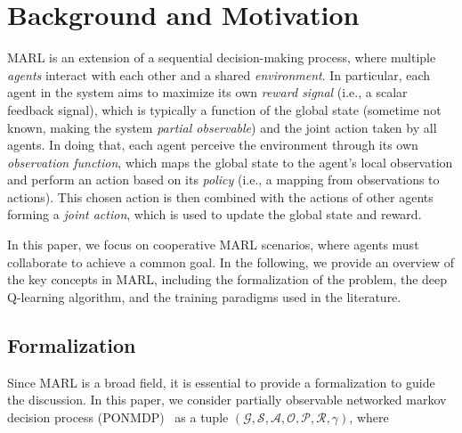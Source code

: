 \documentclass[sigconf]{acmart}
\begin{document}
\section{Background and Motivation}\label{sec:background}
MARL is an extension of a sequential decision-making process, 
where multiple \emph{agents} interact with each other and a shared \emph{environment}.
In particular, each agent in the system aims to maximize its own \emph{reward signal} (i.e., a scalar feedback signal),
which is typically a function of the global state (sometime not known, making the system \emph{partial observable}) and the joint action taken by all agents.
%
In doing that, each agent perceive the environment through its own \emph{observation function},
which maps the global state to the agent's local observation and perform an action based on its \emph{policy} (i.e., a mapping from observations to actions).
%
This chosen action is then combined with the actions of other agents forming a \emph{joint action},
which is used to update the global state and reward.
 
In this paper, we focus on cooperative MARL scenarios, 
where agents must collaborate to achieve a common goal.
In the following, we provide an overview of the key concepts in MARL, 
including the formalization of the problem, the deep Q-learning algorithm, and the training paradigms used in the literature.
\subsection{Formalization}
Since MARL is a broad field, it is essential to provide a formalization to guide the discussion.
In this paper, we consider partially observable networked markov decision process (PONMDP)~\cite{DBLP:journals/tac/AdlakhaLG12} as a tuple $(\mathcal{G}, \mathcal{S}, \mathcal{A}, \mathcal{O}, \mathcal{P}, \mathcal{R}, \gamma)$, where
\end{document}

